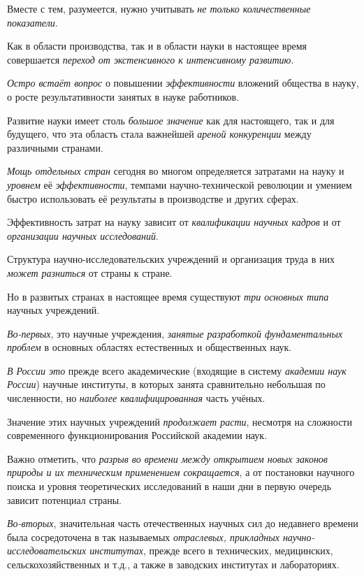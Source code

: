 \documentclass[a4paper,14pt,russian]{extreport}
\begin{document}
Вместе с тем, разумеется, нужно учитывать \emph{не только количественные показатели}.

Как в области производства, так и в области науки в настоящее время совершается \emph{переход от экстенсивного к интенсивному развитию}.

\emph{Остро встаёт вопрос} о повышении \emph{эффективности} вложений общества в науку, о росте результативности занятых в науке работников.

Развитие науки имеет столь \emph{большое значение} как для настоящего, так и для будущего, что эта область стала важнейшей \emph{ареной конкуренции} между различными странами.

\emph{Мощь отдельных стран} сегодня во многом определяется затратами на науку и \emph{уровнем} её \emph{эффективности}, темпами научно-технической революции и умением быстро использовать её результаты в производстве и других сферах.

Эффективность затрат на науку зависит от \emph{квалификации научных кадров} и от \emph{организации научных исследований}.

Структура научно-исследовательских учреждений и организация труда в них \emph{может разниться} от страны к стране.

Но в развитых странах в настоящее время существуют \emph{три основных типа} научных учреждений.

\emph{Во-первых}, это научные учреждения, \emph{занятые разработкой фундаментальных проблем} в основных областях естественных и общественных наук.

\emph{В России это} прежде всего академические (входящие в систему \emph{академии наук России}) научные институты, в которых занята сравнительно небольшая по численности, но \emph{наиболее квалифицированная} часть учёных.

Значение этих научных учреждений \emph{продолжает расти}, несмотря на сложности современного функционирования Российской академии наук.

Важно отметить, что \emph{разрыв во времени между открытием новых законов природы и их техническим применением сокращается}, а от постановки научного поиска и уровня теоретических исследований в наши дни в первую очередь зависит потенциал страны.

\emph{Во-вторых}, значительная часть отечественных научных сил до недавнего времени была сосредоточена в так называемых \emph{отраслевых, прикладных научно-исследовательских институтах}, прежде всего в технических, медицинских, сельскохозяйственных и т.д., а также в заводских институтах и лабораториях.
\end{document}

